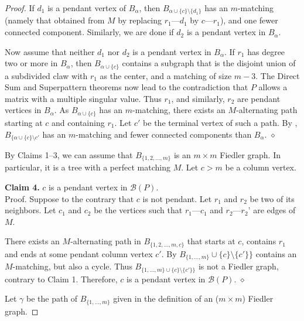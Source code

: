 \documentclass[10pt,a4paper]{amsart}
\begin{document}
\begin{proof}
If $d_1$ is a pendant vertex of $B_{\alpha}$, then $B_{\alpha \cup \{ c\} \setminus \{ d_1\}}$ has an  $m$-matching
(namely that obtained from $M$ by replacing $r_1$---$d_1$ by $c$---$r_1$), 
and one fewer connected component.
Similarly, we are done if $d_2$ is a pendant vertex in $B_{\alpha}$. 

Now assume that neither $d_1$ nor $d_2$ is a pendant vertex in $B_{\alpha}$. If $r_1$ has degree two or more in $B_\alpha$, 
then $B_{\alpha\cup \{c\}}$ contains a subgraph that is the 
disjoint union of  a subdivided claw with $r_1$ as the center, and a matching 
of size $m-3$. The Direct Sum and Superpattern theorems now 
lead to the contradiction that $P$ allows a matrix with a multiple singular value.  Thus $r_1$, and similarly, $r_2$ are pendant vertices
in $B_{\alpha}$.  As $B_{\alpha \cup \{c\} }$ has an $m$-matching, 
there exists an $M$-alternating path starting at $c$ and containing 
$r_1$. Let $c'$ be the terminal vertex of such a 
path. By , $B_{\{\alpha \cup \{ c\} \setminus{c'} }$
has an $m$-matching and fewer connected components than $B_{\alpha}$.
\hfill $\diamond$ 



\bigskip 
By Claims 1--3, we can assume that $B_{\{ 1,2,\ldots, m\}}$
is an $m\times m$ Fiedler graph. In particular, it is a tree
with a perfect matching $M$. Let $c>m$ be a column vertex. 

\bigskip\noindent 
{\bf Claim 4. } $c$ is a pendant vertex in $\mathcal{B}(P)$.
\\[12pt]
Proof. Suppose to the contrary that $c$ is not pendant. 
Let $r_1$ and $r_2$ be two of its neighbors.
Let $c_1$ and $c_2$ be the vertices such that $r_1$---$c_1$ and $r_2$---$r_2$' are edges of $M$. 

There exists an $M$-alternating path 
in $B_{\{1,2,\ldots, m,c\}}$ that starts at $c$, contains $r_1$ 
and ends at some pendant column vertex $c'$.  By 
$B_{\{1, \ldots, m\}} \cup \{c\} \setminus \{c'\}\}$ contains 
an $M$-matching, but also a cycle. Thus  $B_{\{1, \ldots, m\} \cup \{c\} \setminus \{c'\}\}}$ is not a Fiedler graph, contrary to Claim 1.
Therefore, $c$ is  a pendant vertex in $\mathcal{B}(P)$. \hfill $\diamond$ 


\bigskip\noindent
Let $\gamma$ be the path of $B_{\{1,\ldots, m\}}$
given in the definition of an ($m\times m$) Fiedler graph.



\end{proof}
\end{document}
